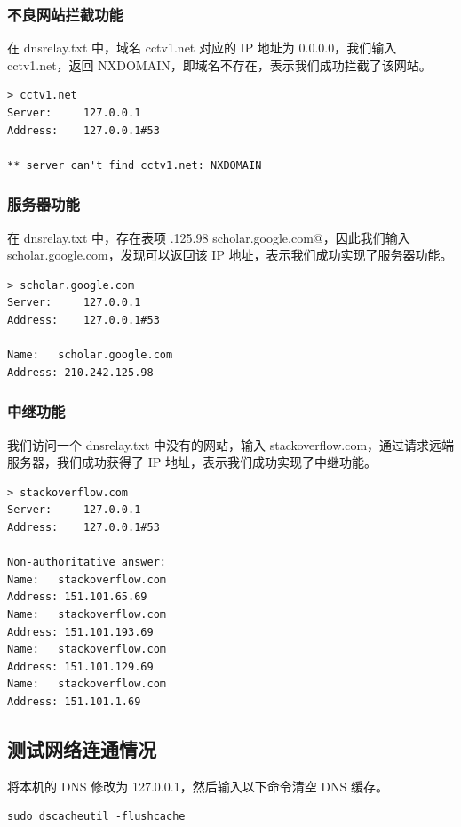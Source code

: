 \documentclass[]{article}
\begin{document}
        \subsubsection{不良网站拦截功能}
            在 dnsrelay.txt 中，域名 cctv1.net 对应的 IP 地址为 0.0.0.0，我们输入 cctv1.net，返回 NXDOMAIN，即域名不存在，表示我们成功拦截了该网站。
            
            \begin{lstlisting}
> cctv1.net
Server:		127.0.0.1
Address:	127.0.0.1#53

** server can't find cctv1.net: NXDOMAIN
            \end{lstlisting}
        
        \subsubsection{服务器功能}
            在 dnsrelay.txt 中，存在表项 .125.98 scholar.google.com@，因此我们输入 scholar.google.com，发现可以返回该 IP 地址，表示我们成功实现了服务器功能。
            
            \begin{lstlisting}
> scholar.google.com
Server:		127.0.0.1
Address:	127.0.0.1#53

Name:	scholar.google.com
Address: 210.242.125.98
            \end{lstlisting}

        \subsubsection{中继功能}
            我们访问一个 dnsrelay.txt 中没有的网站，输入 stackoverflow.com，通过请求远端服务器，我们成功获得了 IP 地址，表示我们成功实现了中继功能。

            \begin{lstlisting}
> stackoverflow.com
Server:		127.0.0.1
Address:	127.0.0.1#53

Non-authoritative answer:
Name:	stackoverflow.com
Address: 151.101.65.69
Name:	stackoverflow.com
Address: 151.101.193.69
Name:	stackoverflow.com
Address: 151.101.129.69
Name:	stackoverflow.com
Address: 151.101.1.69
            \end{lstlisting}
        
    \subsection{测试网络连通情况}
        将本机的 DNS 修改为 127.0.0.1，然后输入以下命令清空 DNS 缓存。
        \begin{lstlisting}
sudo dscacheutil -flushcache
        \end{lstlisting}
\end{document}
